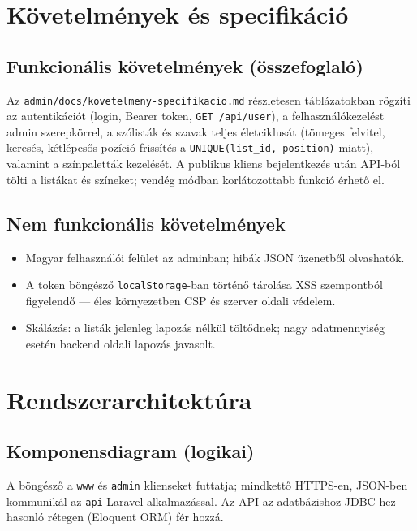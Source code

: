 \chapter{Követelmények és specifikáció}

\section{Funkcionális követelmények (összefoglaló)}
Az \texttt{admin/docs/kovetelmeny-specifikacio.md} részletesen táblázatokban rögzíti az autentikációt (login, Bearer token, \texttt{GET /api/user}), a felhasználókezelést admin szerepkörrel, a szólisták és szavak teljes életciklusát (tömeges felvitel, keresés, kétlépcsős pozíció-frissítés a \texttt{UNIQUE(list\_id, position)} miatt), valamint a színpaletták kezelését. A publikus kliens bejelentkezés után API-ból tölti a listákat és színeket; vendég módban korlátozottabb funkció érhető el.

\section{Nem funkcionális követelmények}
\begin{itemize}
  \item Magyar felhasználói felület az adminban; hibák JSON üzenetből olvashatók.
  \item A token böngésző \texttt{localStorage}-ban történő tárolása XSS szempontból figyelendő — éles környezetben CSP és szerver oldali védelem.
  \item Skálázás: a listák jelenleg lapozás nélkül töltődnek; nagy adatmennyiség esetén backend oldali lapozás javasolt.
\end{itemize}

\chapter{Rendszerarchitektúra}

\section{Komponensdiagram (logikai)}
A böngésző a \texttt{www} és \texttt{admin} klienseket futtatja; mindkettő HTTPS-en, JSON-ben kommunikál az \texttt{api} Laravel alkalmazással. Az API az adatbázishoz JDBC-hez hasonló rétegen (Eloquent ORM) fér hozzá.

